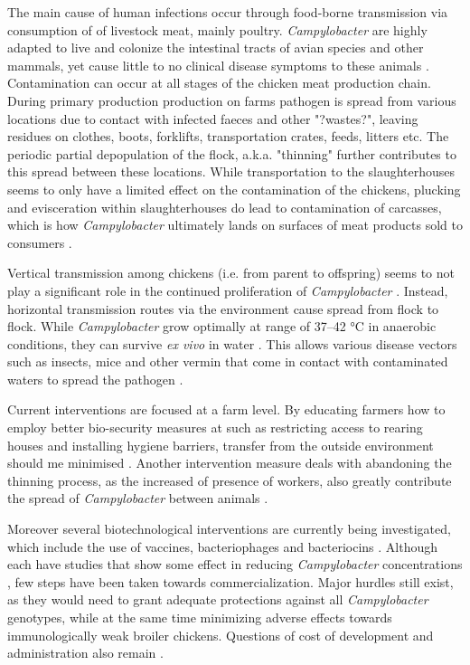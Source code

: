The main cause of human infections occur through food-borne transmission via consumption of of livestock meat, mainly poultry\parencite{wilson_tracing_2008}. \textit{Campylobacter} are highly adapted to live and colonize the intestinal tracts of avian species and other mammals, yet cause little to no clinical disease symptoms to these animals \parencite{saif_diseases_2008}. Contamination can occur at all stages of the chicken meat production chain. During primary production production on farms pathogen is spread from various locations due to contact with infected faeces and other "?wastes?", leaving residues on clothes, boots, forklifts, transportation crates, feeds, litters etc. The periodic partial depopulation of the flock, a.k.a. "thinning" further contributes to this spread between these locations. While transportation to the slaughterhouses seems to only have a limited effect on the contamination of the chickens, plucking and evisceration within slaughterhouses do lead to contamination of carcasses, which is how \textit{Campylobacter} ultimately lands on surfaces of meat products sold to consumers \parencite{skarp_campylobacteriosis_2015}.

Vertical transmission among chickens (i.e. from parent to offspring) seems to not play a significant role in the continued proliferation of \textit{Campylobacter} \parencite{callicott_lack_2006}. Instead, horizontal transmission routes via the environment cause spread from flock to flock. While \textit{Campylobacter} grow optimally at range of 37–42 °C in anaerobic conditions, they can survive \textit{ex vivo} in water \parencite{wilson_tracing_2008}. This allows various disease vectors such as insects, mice and other vermin that come in contact with contaminated waters to spread the pathogen \parencite{newell_sources_2003}.

Current interventions are focused at a farm level. By educating farmers how to employ better bio-security measures at such as restricting access to rearing houses and installing hygiene barriers, transfer from the outside environment should me minimised \parencite{hansson_knowledge_2018}. Another intervention measure deals with abandoning the thinning process, as the increased of presence of workers, also greatly contribute the spread of \textit{Campylobacter} between animals \parencite{lin_novel_2009}. 

Moreover several biotechnological interventions are currently being investigated, which include the use of vaccines, bacteriophages and bacteriocins \parencite{hansson_knowledge_2018}. Although each have studies that show some effect in reducing \textit{Campylobacter} concentrations \parencite{wagenaar_phage_2005}, few steps have been taken towards commercialization. Major hurdles still exist, as they would need to grant adequate protections against all \textit{Campylobacter} genotypes, while at the same time minimizing adverse effects towards immunologically weak broiler chickens. Questions of cost of development and administration also remain \parencite{hansson_knowledge_2018}.

